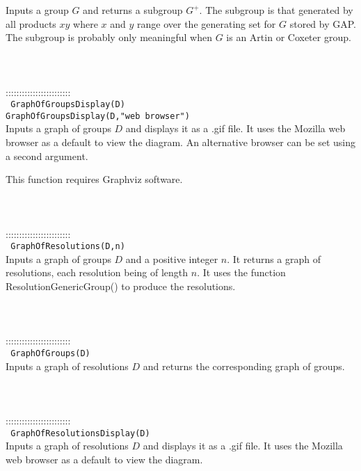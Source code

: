 \documentclass[a4paper,11pt]{report}
\begin{document}
{ Inputs a group $G$ and returns a subgroup $G^+$. The subgroup is that generated by all products $xy$ where $x$ and $y$ range over the generating set for $G$ stored by GAP. The subgroup is probably only meaningful when $G$ is an Artin or Coxeter group. \\
 \\
 \\
 \\
 ::::::::::::::::::::::::\\
 \texttt{ GraphOfGroupsDisplay(D) }\\
 \texttt{GraphOfGroupsDisplay(D,"web browser") }\\
 

 Inputs a graph of groups $D$ and displays it as a .gif file. It uses the Mozilla web browser as a default
to view the diagram. An alternative browser can be set using a second
argument. 

 This function requires Graphviz software. \\
 \\
 \\
 \\
 ::::::::::::::::::::::::\\
 \texttt{ GraphOfResolutions(D,n) }\\
 

 Inputs a graph of groups $D$ and a positive integer $n$. It returns a graph of resolutions, each resolution being of length $n$. It uses the function ResolutionGenericGroup() to produce the resolutions. \\
 \\
 \\
 \\
 ::::::::::::::::::::::::\\
 \texttt{ GraphOfGroups(D) }\\
 

 Inputs a graph of resolutions $D$ and returns the corresponding graph of groups. \\
 \\
 \\
 \\
 ::::::::::::::::::::::::\\
 \texttt{ GraphOfResolutionsDisplay(D) }\\
 

 Inputs a graph of resolutions $D$ and displays it as a .gif file. It uses the Mozilla web browser as a default
to view the diagram. 

}
\end{document}
